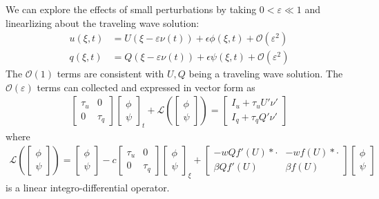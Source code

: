 \documentclass[landscape,final]{baposter}
\newcommand{\LL}{\mathcal{L}}
\newcommand{\OO}{\mathcal{O}}
\begin{document}
\begin{poster}
{
	We can explore the effects of small perturbations by taking $0 < \varepsilon \ll 1$ and linearlizing about the traveling wave solution:
	\begin{align*}
		u(\xi, t) &= U(\xi - \varepsilon \nu(t)) + \epsilon \phi(\xi, t) + \OO(\varepsilon^2) \\
		q(\xi, t) &= Q(\xi - \varepsilon \nu(t)) + \epsilon \psi(\xi, t) + \OO(\varepsilon^2)
	\end{align*}
	The $\OO(1)$ terms are consistent with $U, Q$ being a traveling wave solution. The $\OO(\varepsilon)$ terms can collected and expressed in vector form as
	\begin{align*}
	    \begin{bmatrix}\tau_u & 0 \\ 0 & \tau_q\end{bmatrix} \begin{bmatrix}\phi \\ \psi \end{bmatrix}_t + \LL \left(\begin{bmatrix} \phi \\ \psi \end{bmatrix} \right)
	        = 
	        \begin{bmatrix} I_u + \tau_u U' \nu' \\ I_q + \tau_q Q' \nu ' \end{bmatrix}
	\end{align*}
	where
	\begin{align*}
	\LL \left(\begin{bmatrix} \phi \\ \psi \end{bmatrix} \right) = \begin{bmatrix}\phi \\ \psi \end{bmatrix} - c\begin{bmatrix}\tau_u & 0 \\ 0 & \tau_q\end{bmatrix} \begin{bmatrix}\phi \\ \psi \end{bmatrix}_\xi +
	\begin{bmatrix}
	   -w Q f'(U) * \cdot  & -w f(U) * \cdot \\
	   \beta Q f'(U) & \beta f(U)
	\end{bmatrix}
	\begin{bmatrix}\phi \\ \psi \end{bmatrix}
	\end{align*}
	is a linear integro-differential operator.
	\bigbreak
	
}
\end{poster}
\end{document}
